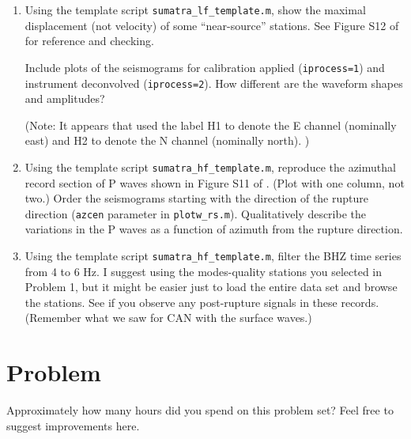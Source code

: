 \documentclass[11pt,titlepage,fleqn]{article}
\begin{document}
\begin{enumerate}
\item Using the template script \verb+sumatra_lf_template.m+, show the maximal displacement (not velocity) of some ``near-source'' stations. See Figure S12 of \citet{Ammon2005} for reference and checking.

Include plots of the seismograms for calibration applied (\verb+iprocess=1+) and instrument deconvolved (\verb+iprocess=2+). How different are the waveform shapes and amplitudes?

(Note: It appears that \citet{Ammon2005} used the label H1 to denote the E channel (nominally east) and H2 to denote the N channel (nominally north). )

\item Using the template script \verb+sumatra_hf_template.m+, reproduce the azimuthal record section of P waves shown in Figure S11 of \citet{Ammon2005}. (Plot with one column, not two.) Order the seismograms starting with the direction of the rupture direction (\verb+azcen+ parameter in \verb+plotw_rs.m+). Qualitatively describe the variations in the P waves as a function of azimuth from the rupture direction.

\item Using the template script \verb+sumatra_hf_template.m+, filter the BHZ time series from 4 to 6 Hz. I suggest using the modes-quality stations you selected in Problem 1, but it might be easier just to load the entire data set and browse the stations. See if you observe any post-rupture signals in these records. (Remember what we saw for CAN with the  surface waves.)

\end{enumerate}



\section*{Problem}

Approximately how many hours did you spend on this problem set? Feel free to suggest improvements here.





%


\end{document}
